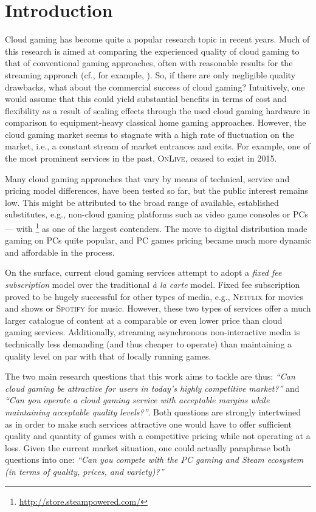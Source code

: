 \section{Introduction}

Cloud gaming has become quite a popular research topic in recent years. Much of this research is aimed at comparing the experienced quality of cloud gaming to that of conventional gaming approaches, often with reasonable results for the streaming approach (cf., for example, \cite{5976180}). So, if there are only negligible quality drawbacks, what about the commercial success of cloud gaming? Intuitively, one would assume that this could yield substantial benefits in terms of cost and flexibility as a result of scaling effects through the used cloud gaming hardware in comparison to equipment-heavy classical home gaming approaches. However, the cloud gaming market seems to stagnate with a high rate of fluctuation on the market, i.e., a constant stream of market entrances and exits. For example, one of the most prominent services in the past, \textsc{OnLive}, ceased to exist in 2015.

Many cloud gaming approaches that vary by means of technical, service and pricing model differences, have been tested so far, but the public interest remains low. This might be attributed to the broad range of available, established substitutes, e.g., non-cloud gaming platforms such as video game consoles or PCs --- with \steam\footnote{\url{http://store.steampowered.com/}} as one of the largest contenders. The move to digital distribution made gaming on PCs quite popular, and PC games pricing became much more dynamic and affordable in the process.

On the surface, current cloud gaming services attempt to adopt a \textit{fixed fee subscription} model over the traditional \textit{à la carte} model. Fixed fee subscription proved to be hugely successful for other types of media, e.g., \textsc{Netflix} for movies and shows or \textsc{Spotify} for music. However, these two types of services offer a much larger catalogue of content at a comparable or even lower price than cloud gaming services. Additionally, streaming asynchronous non-interactive media is technically less demanding (and thus cheaper to operate) than maintaining a quality level on par with that of locally running games.

The two main research questions that this work aims to tackle are thus: \textit{``Can cloud gaming be attractive for users in today's highly competitive market?''} and \textit{``Can you operate a cloud gaming service with acceptable margins while maintaining acceptable quality levels?''}. Both questions are strongly intertwined as in order to make such services attractive one would have to offer sufficient quality and quantity of games with a competitive pricing while not operating at a loss. Given the current market situation, one could actually paraphrase both questions into one: \textit{``Can you compete with the PC gaming and Steam ecosystem (in terms of quality, prices, and variety)?''}

